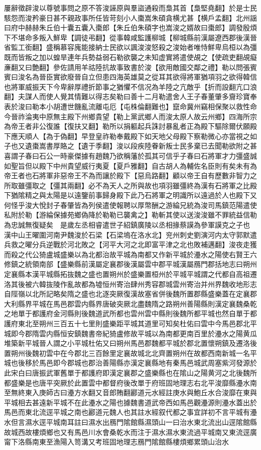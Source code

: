 屢辭徵辟浚以尊號事問之原不答浚誣原與羣盜通殺而梟其首【梟堅堯翻】於是士民駭怨而浚矜豪日甚不親政事所任皆苛刻小人棗嵩朱碩貪横尤甚【横戶孟翻】北州謡曰府中赫赫朱丘伯十囊五囊入棗郎【朱丘伯朱碩字也嵩浚之婿故曰棗郎】調發殷煩下不堪命多叛入鮮卑【調徒弔翻】從事韓咸監護柳城【柳城縣前漢屬遼西郡後漢晉省監工銜翻】盛稱慕容廆能接納士民欲以諷浚浚怒殺之浚始者唯恃鮮卑烏桓以為彊既而皆叛之加以蝗旱連年兵勢益弱石勒欲襲之未知虚實將遣使覘之【使疏吏翻覘癡亷翻又曰艶翻】參佐請用羊祜陸抗故事致書於浚【欲用敵國交鄰之禮】勒以問張賓賓曰浚名為晉臣實欲廢晉自立但患四海英雄莫之從耳其欲得將軍猶項羽之欲得韓信也將軍威振天下今卑辭厚禮折節事之猶懼不信况為羊陸之亢敵乎【折而設翻亢口浪翻】夫謀人而使人覺其情難以得志矣勒曰善十二月勒遣舍人王子春董肇多齎珍寶奉表於浚曰勒本小胡遭世饑亂流離屯厄【屯株倫翻難也】竄命冀州竊相保聚以救性命今晉祚淪夷中原無主殿下州鄉貴望【勒上黨武鄉人而浚太原人故云州鄉】四海所宗為帝王者非公復誰【復扶又翻】勒所以捐軀起兵誅討暴亂者正為殿下驅除爾伏願殿下應天順人【為于偽翻】早登皇祚勒奉戴殿下如天地父母殿下察勒微心亦當視之如子也又遺棗嵩書厚賂之【遺于季翻】浚以段疾陸眷新叛士民多棄已去聞勒欲附之甚喜謂子春曰石公一時豪傑據有趙魏乃欲稱藩於孤其可信乎子春曰石將軍才力彊盛誠如聖旨但以殿下中州貴望威行夷夏【夏戶雅翻】自古胡人為輔佐名臣則有矣未有為帝王者也石將軍非惡帝王不為而讓於殿下【惡烏路翻】顧以帝王自有歷數非智力之所取雖彊取之【彊其兩翻】必不為天人之所與故也項羽雖彊終為漢有石將軍之比殿下猶隂精之與太陽是以遠鑒前事歸身殿下此乃石將軍之明識所以遠過於人也殿下又何怪乎浚大悅封子春肇皆為列侯遣使報聘以厚幣酬之游綸兄統為浚司馬鎮范陽遣使私附於勒【游綸保據苑鄉偽降於勒勒已襲禽之】勒斬其使以送浚浚雖不罪統益信勒為忠誠無復疑矣　是歲左丞相睿遣世子紹鎮廣陵以丞相掾蔡謨為參軍謨克之子也　漢中山王曜圍河南尹魏浚於石梁【石梁塢在洛水北】兖州刺史劉演河内太守郭默遣兵救之曜分兵逆戰於河北敗之【河平大河之北即富平津之北也敗補邁翻】浚夜走獲而殺之代公猗盧城盛樂以為北都治故平城為南都又作新平城於灅水之陽使右賢王六修鎮之統領南部【盛樂縣前漢屬定襄郡後漢屬雲中郡平城漢屬鴈門郡括地志曰朔州定襄縣本漢平城縣拓抜魏之盛也置朔州於盛樂置桓州於平城平城謂之代都自高祖遷洛其後被六韓抜陵作亂故都為墟恒州寄治肆州秀容郡城雲州寄治并州界魏收地形志自陘嶺以北所記略矣隋之盛也北逐突厥復漢故塞省併後魏所置郡縣盛樂蓋在定襄郡大利縣界平城在馬邑郡雲内縣界唐破突厥北盡魏隋之路朔州善陽縣則漢定襄魏桑乾之地單于都護府金河縣則後魏道武所都也雲州雲中縣則後魏所都平城也然自單于都護府東北至朔州三百五十七里則盛樂距平城其道里可知矣杜佑曰雲中今馬邑郡北平城即今郡隋雲内縣恒安鎮魏書帝紀猗盧修故平城以為南都更南百里於灅水之陽黄瓜堆築新平城晉人謂之小平城杜佑又曰朔州馬邑郡魏都平城於郡北置懷朔鎮及遷洛後置朔州後魏初雲中在今郡北三百餘里定襄故城北北齊置朔州在故都西南新城一名平城也後移於馬邑即今郡城也郡治善陽縣亦漢定襄縣地有秦馬邑城武周塞紫河發源於此宋白曰唐振武軍舊單于都護府即漢定襄郡之盛樂縣也在隂山之陽黄河之北後魏所都盛樂是也唐平突厥於此置雲中都督府後改單于府班固地理志右北平浚靡縣灅水南至無終東入庚師古曰灅方水翻又音郎賄翻酈道元水經註庚水與鮑丘水合浚靡在東與平城相去甚遠新平城不在此灅水之陽也據魏書道武帝西如馬邑觀灅源則灅水蓋出於馬邑而東北流逕平城之南也酈道元魏人也其註水經叙代都之事宜詳初不言平城有灅水但言濕水逕平城南耳註曰濕水出鴈門隂館縣濕頭山一曰治水東北流出山逕隂館縣故城西故樓煩鄉也又有馬邑川水會桑乾水而注于濕水濕水東流過平城南又東流逕廣甯下洛縣南東至漁陽入笥溝又考班固地理志鴈門隂館縣樓煩鄉累頭山治水